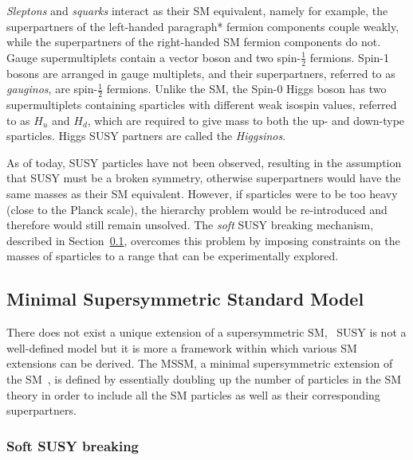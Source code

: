 		\textit{Sleptons} and \textit{squarks} interact as their \ac{SM} equivalent, namely for example, the superpartners of the left-handed paragraph* fermion components couple weakly, while the superpartners of the right-handed \ac{SM} fermion components do not. Gauge supermultiplets contain a vector boson and two spin-$\frac{1}{2}$ fermions. Spin-1 bosons are arranged in gauge multiplets, and their superpartners, referred to as \textit{gauginos}, are spin-$\frac{1}{2}$ fermions. Unlike the \ac{SM}, the Spin-0 Higgs boson has two supermultiplets containing sparticles with different weak isospin values, referred to as $H_u$ and $H_d$, which are required to give mass to both the up- and down-type sparticles. Higgs \ac{SUSY} partners are called the \textit{Higgsinos}.

		As of today, \ac{SUSY} particles have not been observed, resulting in the assumption that \ac{SUSY} must be a broken symmetry, otherwise superpartners would have the same masses as their \ac{SM} equivalent. However, if sparticles were to be too heavy (close to the Planck scale), the hierarchy problem would be re-introduced and therefore would still remain unsolved. The \emph{soft} \ac{SUSY} breaking mechanism, described in Section~\ref{sec:MSSM}, overcomes this problem by imposing constraints on the masses of sparticles to a range that can be experimentally explored. 		


		\subsection{Minimal Supersymmetric Standard Model}
		\label{sec:MSSM}
			
			There does not exist a unique extension of a supersymmetric \ac{SM}, \ie\ \ac{SUSY} is not a well-defined model but it is more a framework within which various \ac{SM} extensions can be derived.
			The \ac{MSSM}, a minimal supersymmetric extension of the \ac{SM}~\cite{Jegerlehner:2013nna}, is defined by essentially doubling up the number of particles in the \ac{SM} theory in order to include all the \ac{SM} particles as well as their corresponding superpartners.

			\subsubsection*{Soft SUSY breaking}
				
